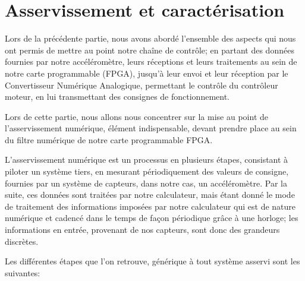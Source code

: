 \documentclass[french,a4paper,12pt]{report}
\begin{document}
%
	\part{Asservissement et caractérisation}
	
	Lors de la précédente partie, nous avons abordé l'ensemble des aspects qui nous ont permis de mettre au point notre chaîne de contrôle; en partant des données fournies par notre accéléromètre, leurs réceptions et leurs traitements au sein de notre carte programmable (FPGA), jusqu'à leur envoi et leur réception par le Convertisseur Numérique Analogique, permettant le contrôle du contrôleur moteur, en lui transmettant des consignes de fonctionnement.
	
	Lors de cette partie, nous allons nous concentrer sur la mise au point de l'asservissement numérique, élément indispensable, devant prendre place au sein du filtre numérique de notre carte programmable FPGA.
	
	L'asservissement numérique est un processus en plusieurs étapes, consistant à piloter un système tiers, en mesurant périodiquement des valeurs de consigne, fournies par un système de capteurs, dans notre cas, un accéléromètre. 
	Par la suite, ces données sont traitées par notre calculateur, mais étant donné le mode de traitement des informations imposées par notre calculateur qui est de nature numérique et cadencé dans le temps de façon périodique grâce à une horloge; les informations en entrée, provenant de nos capteurs, sont donc des grandeurs discrètes.
	
	Les différentes étapes que l'on retrouve, générique à tout système asservi sont les suivantes:
	
\end{document}
